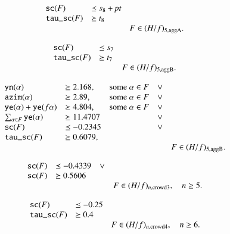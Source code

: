 \begin{equation}
    \begin{array}{lll}
        {\operatorname{{\texttt{sc}}}}(F) &\preceq s_8 + \hbox{\it pt}\\
        {\operatorname{{\texttt{tau\_sc}}}}(F) &\succeq t_8\\
        &&F \in (H/f)_{5,{\operatorname{aggA}}}.
    \end{array}
\end{equation}

\begin{equation}
    \begin{array}{lll}
        {\operatorname{{\texttt{sc}}}}(F) &\preceq s_7\\
        {\operatorname{{\texttt{tau\_sc}}}}(F) &\succeq t_7\\
        &&F \in (H/f)_{5,{\operatorname{aggB}}}.
    \end{array}
\end{equation}

\begin{equation}
    \begin{array}{lllll}
        {\operatorname{{\texttt{yn}}}}(\alpha) &\succeq 2.168,&\text{some }\alpha\in F
        &\vee\\
        {\operatorname{{\texttt{azim}}}}(\alpha) &\succeq 2.89,&\text{some }\alpha\in
        F&\vee\\
        {\operatorname{{\texttt{ye}}}}(\alpha)+{\operatorname{{\texttt{ye}}}}(f\alpha)&\succeq
        4.804,&\text{some }\alpha\in F&\vee\\
        \sum_{\alpha\in F} {\operatorname{{\texttt{ye}}}}(\alpha) &\succeq
        11.4707&&\vee\\
        {\operatorname{{\texttt{sc}}}}(F) &\preceq -0.2345&&\vee\\
        {\operatorname{{\texttt{tau\_sc}}}}(F) &\succeq 0.6079,\\
        &&&&F\in (H/f)_{5,{\operatorname{aggB}}}.
    \end{array}
\end{equation}

\begin{equation}
    \begin{array}{llll}
        {\operatorname{{\texttt{sc}}}}(F) &\preceq -0.4339&\vee\\
        {\operatorname{{\texttt{sc}}}}(F) &\succeq 0.5606\\
        &&&F\in (H/f)_{n,{\operatorname{crowd3}}},\quad n\ge 5.
    \end{array}
\end{equation}

\begin{equation}
    \begin{array}{llll}
        {\operatorname{{\texttt{sc}}}}(F) &\preceq -0.25\\
        {\operatorname{{\texttt{tau\_sc}}}}(F) &\succeq 0.4\\
        &&F\in (H/f)_{n,{\operatorname{crowd4}}},\quad n\ge 6.
    \end{array}
\end{equation}


